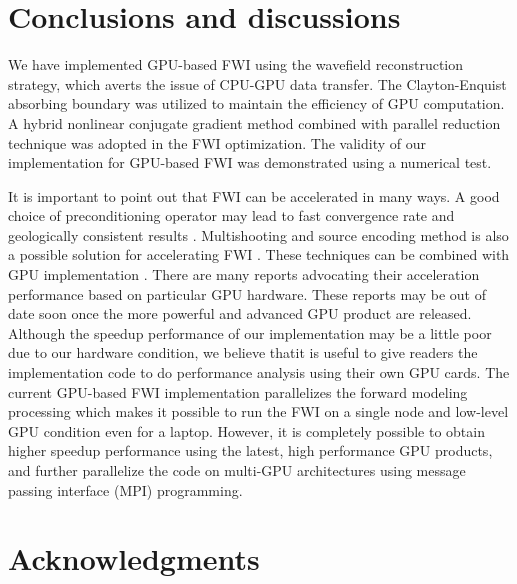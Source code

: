 


\section{Conclusions and discussions}

We have implemented GPU-based FWI using the wavefield reconstruction strategy, which averts the issue of CPU-GPU data transfer. The Clayton-Enquist absorbing boundary was utilized to maintain the efficiency of GPU computation. A hybrid nonlinear conjugate gradient method combined with parallel reduction technique was adopted in the FWI optimization. The validity of our  implementation for GPU-based FWI was demonstrated using a numerical test. 

It is important to point out that FWI can be accelerated in many ways. A good choice of preconditioning operator may lead to fast convergence rate and geologically consistent results \citep{virieux2009overview,ayeni2009joint,guitton2012constrained}. Multishooting and source encoding method is also a possible solution for accelerating FWI \citep{schiemenz2013accelerated,moghaddam2013new}. These techniques can be combined with GPU implementation \cite{wang2011cuda}. There are many reports advocating their acceleration performance based on particular GPU hardware. These reports may be out of date soon once the more powerful and advanced GPU product are released. Although the speedup performance of our implementation may be a little poor due to our hardware condition, we believe thatit is useful to give readers the implementation code to do performance analysis using their own GPU cards. The current GPU-based FWI implementation parallelizes the forward modeling processing which makes it possible to run the FWI on a single node and low-level GPU condition even for a laptop. However, it  is completely possible to obtain higher speedup performance using the latest, high performance GPU products, and further parallelize the code on multi-GPU architectures using message passing interface (MPI) programming.

\section*{Acknowledgments}

